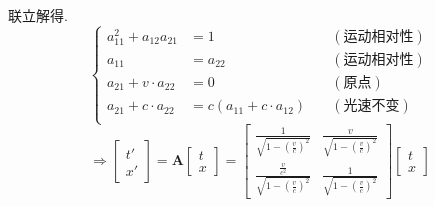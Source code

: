 \documentclass{article}
\begin{document}
    联立解得.
        \[\left\{\begin{array}{rll}
            a_{11}^2 + a_{12}a_{21} &= 1 &\quad (\text{运动相对性})\\
            a_{11} &= a_{22}  &\quad (\text{运动相对性})\\
            a_{21} + v·a_{22} &= 0 &\quad (\text{原点})\\
            a_{21} + c·a_{22} &= c(a_{11} + c·a_{12} ) &\quad (\text{光速不变})\\
        \end{array}\right.\]
        \[\Rightarrow \begin{bmatrix}t' \\ x'\end{bmatrix} = \boldsymbol A \begin{bmatrix}t \\ x\end{bmatrix} = \begin{bmatrix}
            \frac{1}{\sqrt{1-\left( \frac{v}{c} \right)^{2}}} & \frac{v}{\sqrt{1-\left( \frac{v}{c} \right)^{2}}}\\
            \frac{\frac{v}{c^{2}}}{\sqrt{1-\left( \frac{v}{c} \right)^{2}}} & \frac{1}{\sqrt{1-\left( \frac{v}{c} \right)^{2}}}
        \end{bmatrix} \begin{bmatrix}t \\ x\end{bmatrix}\]
\end{document}
